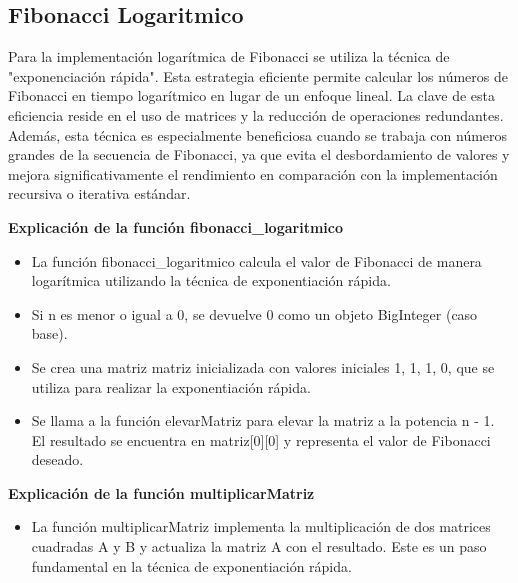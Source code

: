 \documentclass{article}
\begin{document}
        
        \subsection{Fibonacci Logaritmico}
            Para la implementación logarítmica de Fibonacci se utiliza la técnica de "exponenciación rápida". Esta estrategia eficiente permite calcular los números de Fibonacci en tiempo logarítmico en lugar de un enfoque lineal. La clave de esta eficiencia reside en el uso de matrices y la reducción de operaciones redundantes. Además, esta técnica es especialmente beneficiosa cuando se trabaja con números grandes de la secuencia de Fibonacci, ya que evita el desbordamiento de valores y mejora significativamente el rendimiento en comparación con la implementación recursiva o iterativa estándar.

            	

            \textbf{Explicación de la función fibonacci\_logaritmico}\par  
            \begin{itemize}
                \item {La función fibonacci\_logaritmico calcula el valor de Fibonacci de manera logarítmica utilizando la técnica de exponentiación rápida.}
                \item {Si n es menor o igual a 0, se devuelve 0 como un objeto BigInteger (caso base).}
                \item {Se crea una matriz matriz inicializada con valores iniciales {{1, 1}, {1, 0}}, que se utiliza para realizar la exponentiación rápida.}
                \item {Se llama a la función elevarMatriz para elevar la matriz a la potencia n - 1. El resultado se encuentra en matriz[0][0] y representa el valor de Fibonacci deseado.}
            \end{itemize}

            \textbf{Explicación de la función multiplicarMatriz}\par  
            \begin{itemize}
                \item {La función multiplicarMatriz implementa la multiplicación de dos matrices cuadradas A y B y actualiza la matriz A con el resultado. Este es un paso fundamental en la técnica de exponentiación rápida.}
            \end{itemize}
\end{document}
